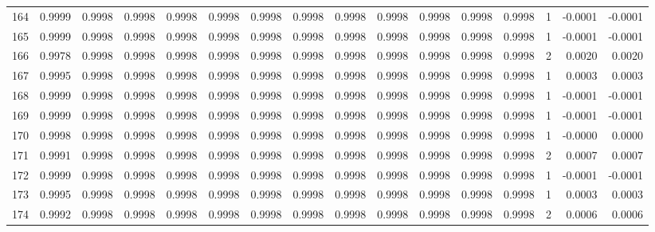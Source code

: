\begin{tabular}{lrrrrrrrrrrrrrrr}
164 &      0.9999 &  0.9998 &  0.9998 &  0.9998 &  0.9998 &  0.9998 &  0.9998 &  0.9998 &  0.9998 &  0.9998 &   0.9998 &     0.9998 &      1 &                   -0.0001 &                    -0.0001 \\
165 &      0.9999 &  0.9998 &  0.9998 &  0.9998 &  0.9998 &  0.9998 &  0.9998 &  0.9998 &  0.9998 &  0.9998 &   0.9998 &     0.9998 &      1 &                   -0.0001 &                    -0.0001 \\
166 &      0.9978 &  0.9998 &  0.9998 &  0.9998 &  0.9998 &  0.9998 &  0.9998 &  0.9998 &  0.9998 &  0.9998 &   0.9998 &     0.9998 &      2 &                    0.0020 &                     0.0020 \\
167 &      0.9995 &  0.9998 &  0.9998 &  0.9998 &  0.9998 &  0.9998 &  0.9998 &  0.9998 &  0.9998 &  0.9998 &   0.9998 &     0.9998 &      1 &                    0.0003 &                     0.0003 \\
168 &      0.9999 &  0.9998 &  0.9998 &  0.9998 &  0.9998 &  0.9998 &  0.9998 &  0.9998 &  0.9998 &  0.9998 &   0.9998 &     0.9998 &      1 &                   -0.0001 &                    -0.0001 \\
169 &      0.9999 &  0.9998 &  0.9998 &  0.9998 &  0.9998 &  0.9998 &  0.9998 &  0.9998 &  0.9998 &  0.9998 &   0.9998 &     0.9998 &      1 &                   -0.0001 &                    -0.0001 \\
170 &      0.9998 &  0.9998 &  0.9998 &  0.9998 &  0.9998 &  0.9998 &  0.9998 &  0.9998 &  0.9998 &  0.9998 &   0.9998 &     0.9998 &      1 &                   -0.0000 &                     0.0000 \\
171 &      0.9991 &  0.9998 &  0.9998 &  0.9998 &  0.9998 &  0.9998 &  0.9998 &  0.9998 &  0.9998 &  0.9998 &   0.9998 &     0.9998 &      2 &                    0.0007 &                     0.0007 \\
172 &      0.9999 &  0.9998 &  0.9998 &  0.9998 &  0.9998 &  0.9998 &  0.9998 &  0.9998 &  0.9998 &  0.9998 &   0.9998 &     0.9998 &      1 &                   -0.0001 &                    -0.0001 \\
173 &      0.9995 &  0.9998 &  0.9998 &  0.9998 &  0.9998 &  0.9998 &  0.9998 &  0.9998 &  0.9998 &  0.9998 &   0.9998 &     0.9998 &      1 &                    0.0003 &                     0.0003 \\
174 &      0.9992 &  0.9998 &  0.9998 &  0.9998 &  0.9998 &  0.9998 &  0.9998 &  0.9998 &  0.9998 &  0.9998 &   0.9998 &     0.9998 &      2 &                    0.0006 &                     0.0006 \\

\end{tabular}
